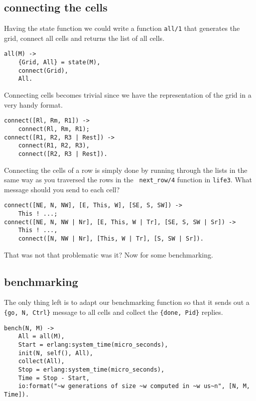 \documentclass[a4paper,11pt]{article}
\begin{document}
\subsection{connecting the cells}

Having the state function we could write a function {\tt all/1} that
generates the grid, connect all cells and returns the list of all
cells.

\begin{verbatim}
all(M) ->
    {Grid, All} = state(M),
    connect(Grid),
    All.
\end{verbatim}


Connecting cells becomes trivial since we have the representation of
the grid in a very handy format.

\begin{verbatim}
connect([Rl, Rm, R1]) -> 
    connect(Rl, Rm, R1);
connect([R1, R2, R3 | Rest]) ->
    connect(R1, R2, R3),
    connect([R2, R3 | Rest]).
\end{verbatim}

Connecting the cells of a row is simply done by running through the
lists in the same way as you traversed the rows in the {\tt
  next\_row/4} function in {\tt life3}. What message should you send
to each cell?


\begin{verbatim}
connect([NE, N, NW], [E, This, W], [SE, S, SW]) ->
    This ! ...;
connect([NE, N, NW | Nr], [E, This, W | Tr], [SE, S, SW | Sr]) ->
    This ! ...,
    connect([N, NW | Nr], [This, W | Tr], [S, SW | Sr]).
\end{verbatim}

That was not that problematic was it? Now for some benchmarking.

\subsection{benchmarking}

The only thing left is to adapt our benchmarking function so that it
sends out a {\tt \{go, N, Ctrl\}} message to all cells and collect the
{\tt \{done, Pid\}} replies.

\begin{verbatim}
bench(N, M) ->
    All = all(M),
    Start = erlang:system_time(micro_seconds),
    init(N, self(), All),
    collect(All),
    Stop = erlang:system_time(micro_seconds),
    Time = Stop - Start,
    io:format("~w generations of size ~w computed in ~w us~n", [N, M, Time]).

\end{verbatim}
\end{document}
